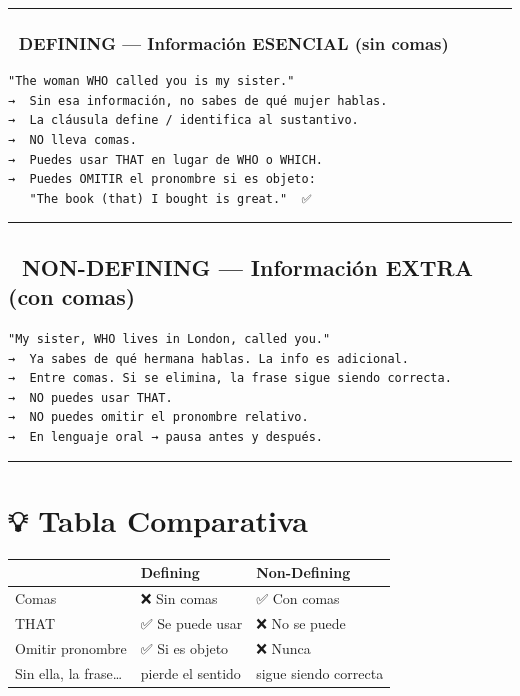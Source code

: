 \documentclass[
  spanish,
  letterpaper,
]{scrbook}
\begin{document}
\begin{center}\rule{0.5\linewidth}{0.5pt}\end{center}

\subsubsection{🔵 DEFINING --- Información ESENCIAL (sin
comas)}\label{defining-informaciuxf3n-esencial-sin-comas}

\begin{verbatim}
"The woman WHO called you is my sister."
→  Sin esa información, no sabes de qué mujer hablas.
→  La cláusula define / identifica al sustantivo.
→  NO lleva comas.
→  Puedes usar THAT en lugar de WHO o WHICH.
→  Puedes OMITIR el pronombre si es objeto:
   "The book (that) I bought is great."  ✅
\end{verbatim}

\begin{center}\rule{0.5\linewidth}{0.5pt}\end{center}

\subsection{🔴 NON-DEFINING --- Información EXTRA (con
comas)}\label{non-defining-informaciuxf3n-extra-con-comas}

\begin{verbatim}
"My sister, WHO lives in London, called you."
→  Ya sabes de qué hermana hablas. La info es adicional.
→  Entre comas. Si se elimina, la frase sigue siendo correcta.
→  NO puedes usar THAT.
→  NO puedes omitir el pronombre relativo.
→  En lenguaje oral → pausa antes y después.
\end{verbatim}

\begin{center}\rule{0.5\linewidth}{0.5pt}\end{center}

\section{💡 Tabla Comparativa}\label{tabla-comparativa}

\begin{longtable}[]{@{}lll@{}}
\toprule\noalign{}
& Defining & Non-Defining \\
\midrule\noalign{}
\endhead
\bottomrule\noalign{}
\endlastfoot
Comas & ❌ Sin comas & ✅ Con comas \\
THAT & ✅ Se puede usar & ❌ No se puede \\
Omitir pronombre & ✅ Si es objeto & ❌ Nunca \\
Sin ella, la frase\ldots{} & pierde el sentido & sigue siendo
correcta \\
\end{longtable}
\end{document}
